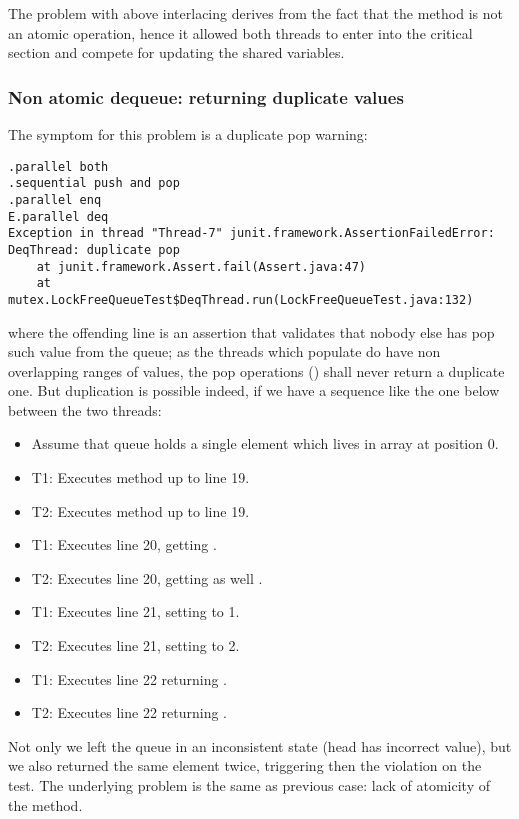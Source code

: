 The problem with above interlacing derives from the fact that the
 method is not an atomic operation, hence it allowed both threads to
enter into the critical section and compete for updating the shared
variables. 

\subsubsection{Non atomic dequeue: returning duplicate values}

The symptom for this problem is a duplicate pop warning: \\

\begin{verbatim}
.parallel both
.sequential push and pop
.parallel enq
E.parallel deq
Exception in thread "Thread-7" junit.framework.AssertionFailedError: 
DeqThread: duplicate pop
	at junit.framework.Assert.fail(Assert.java:47)
	at mutex.LockFreeQueueTest$DeqThread.run(LockFreeQueueTest.java:132)
\end{verbatim}
\hfill

where the offending line is an assertion that validates that nobody
else has pop such value from the queue; as the threads which populate
do have non overlapping ranges of values, the pop operations ()
shall never return a duplicate one. But duplication is possible
indeed, if we have a sequence like the one below between the two threads:

\begin{itemize}
\item Assume that queue holds a single element which lives in 
  array at position 0.
\item T1: Executes method up to line 19. 
\item T2: Executes method up to line 19. 
\item T1: Executes line 20, getting .
\item T2: Executes line 20, getting as well .
\item T1: Executes line 21, setting  to 1.
\item T2: Executes line 21, setting  to 2.
\item T1: Executes line 22 returning .
\item T2: Executes line 22 returning .
\end{itemize}
\hfill

Not only we left the queue in an inconsistent state (head has
incorrect value), but we also returned the same element twice,
triggering then the violation on the test. The underlying problem is
the same as previous case: lack of atomicity of the  method.

